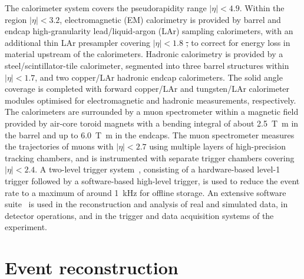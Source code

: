 \documentclass[PAPER, coverpage, atlasdraft=true, texlive=2016, UKenglish]{\ATLASLATEXPATH atlasdoc}
\providecommand{\DIFdel}[1]{{\protect\color{red}\sout{#1}}}                      %
\providecommand{\DIFdelbegin}{} %
\providecommand{\DIFdelend}{} %
\begin{document}
The calorimeter system covers the pseudorapidity range $|\eta| < 4.9$. Within the region $|\eta|< 3.2$, electromagnetic (EM) calorimetry is provided by barrel and endcap high-granularity lead/liquid-argon (LAr) sampling calorimeters, with an additional thin LAr presampler covering $|\eta| < 1.8$ \DIFdelbegin \DIFdel{, }\DIFdelend to correct for energy loss in material upstream of the calorimeters. Hadronic calorimetry is provided by %
a steel/scintillator-tile calorimeter, segmented into three barrel structures within $|\eta| < 1.7$, and two copper/LAr hadronic endcap calorimeters.
The solid angle coverage is completed with forward copper/LAr and tungsten/LAr calorimeter modules optimised for electromagnetic and hadronic measurements, respectively.
The calorimeters are surrounded by a muon spectrometer within a magnetic field provided by air-core toroid magnets with a bending integral of about \SI{2.5}{\tesla\metre} in the barrel and up to \SI{6.0}{\tesla\metre} in the endcaps. 
The muon spectrometer measures the trajectories of muons with $|\eta|<2.7$ using multiple layers of high-precision tracking chambers, and is instrumented with separate trigger chambers covering $|\eta|<2.4$. A two-level trigger system~\cite{Aaboud:2016leb}, consisting of a hardware-based level-1 trigger followed by a software-based high-level trigger, is used to reduce the event rate to a maximum of around \SI{1}{\kHz} for offline storage.
An extensive software suite~\cite{ATL-SOFT-PUB-2021-001} is used in the reconstruction and analysis of real and simulated data, in detector operations, and in the trigger and data acquisition systems of the experiment.


\section{Event reconstruction}
\label{sec:objects}
\end{document}
